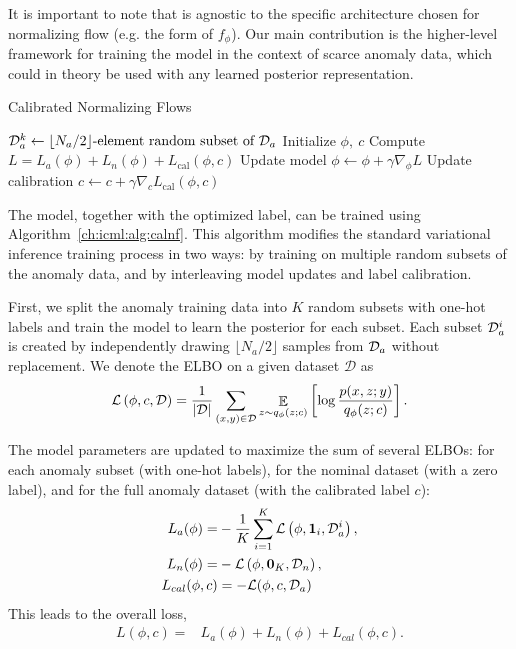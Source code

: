 It is important to note that \ouralg{} is agnostic to the specific architecture chosen for normalizing flow (e.g. the form of $f_\phi$). Our main contribution is the higher-level framework for training the model in the context of scarce anomaly data, which could in theory be used with any learned posterior representation.

\begin{algorithm}[H]
    \caption{Calibrated Normalizing Flows}
    \label{ch:icml:alg:calnf}
    \DontPrintSemicolon
    {
        $\mathcal{D}_a^k \gets \text{$\lfloor N_a/2 \rfloor$-element random subset of } \mathcal{D}_a$\;
    }
    Initialize $\phi,\ c$\;
    {
        Compute $L = L_a(\phi) + L_n(\phi) + L_{\text{cal}}(\phi, c)$\;
        Update model $\phi \gets \phi + \gamma \nabla_\phi L$\;
        Update calibration $c \gets c + \gamma \nabla_c L_{\text{cal}}(\phi, c)$\;
    }
\end{algorithm}

The \ouralg{} model, together with the optimized label, can be trained using Algorithm~\ref{ch:icml:alg:calnf}. This algorithm modifies the standard variational inference training process in two ways: by training on multiple random subsets of the anomaly data, and by interleaving model updates and label calibration.

First, we split the anomaly training data into $K$ random subsets with one-hot labels and train the model to learn the posterior for each subset. Each subset $\mathcal{D}_a^i$ is created by independently drawing $\lfloor N_a/2 \rfloor$ samples from $\mathcal{D}_a$ without replacement. We denote the ELBO on a given dataset $\mathcal{D}$ as
\begin{equation}
    \mathcal{L}\left( \phi, c, \mathcal{D} \right) = \frac{1}{\left| \mathcal{D} \right|} \sum_{(x, y) \in \mathcal{D}} \mathop{\mathbb{E}}_{z\sim q_{\phi}(z; c)}\left[ \log \frac{p(x, z; y)}{q_\phi(z; c)} \right].
\end{equation}

The model parameters are updated to maximize the sum of several ELBOs: for each anomaly subset (with one-hot labels), for the nominal dataset (with a zero label), and for the full anomaly dataset (with the calibrated label $c$):
\begin{align}
    L_{a}(\phi) =    & -\frac{1}{K} \sum_{i=1}^K \mathcal{L}\left( \phi, \mathbf{1}_i, \mathcal{D}_a^i \right), \\
    L_{n}(\phi) =    & -\mathcal{L}\left( \phi, \mathbf{0}_K, \mathcal{D}_n \right),                            \\
    L_{cal}(\phi, c) & = -\mathcal{L}(\phi, c, \mathcal{D}_a)
\end{align}
This leads to the overall loss,
\begin{align}
    L(\phi, c) = & L_{a}(\phi) + L_{n}(\phi) + L_{cal}(\phi, c).
\end{align}

